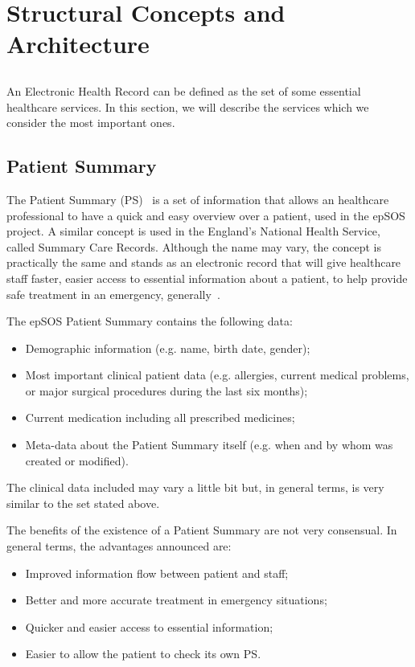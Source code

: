 \chapter{Structural Concepts and Architecture}

\section*{}
An Electronic Health Record can be defined as the set of some essential healthcare services. In this section, we will describe the services which we consider the most important ones.

\section{Patient Summary} \label{sec:pat_sum}

The Patient Summary (PS)~\citep{EPSOS_PS} is a set of information that allows an healthcare professional to have a quick and easy overview over a patient, used in the epSOS project. A similar concept is used in the England's National Health Service, called Summary Care Records. Although the name may vary, the concept is practically the same and stands as an electronic record that will give healthcare staff faster, easier access to essential information about a patient, to help provide safe treatment in an emergency, generally~\citep{Service2010}.

The epSOS Patient Summary contains the following data:
\begin{itemize}
\item Demographic information (e.g. name, birth date, gender);
\item Most important clinical patient data (e.g. allergies, current medical problems, or major surgical procedures during the last six months);
\item Current medication including all prescribed medicines;
\item Meta-data about the Patient Summary itself (e.g. when and by whom was created or modified).
\end{itemize}

The clinical data included may vary a little bit but, in general terms, is very similar to the set stated above. 

The benefits of the existence of a Patient Summary are not very consensual. In general terms, the advantages announced are:
\begin{itemize}
\item Improved information flow between patient and staff;
\item Better and more accurate treatment in emergency situations;
\item Quicker and easier access to essential information;
\item Easier to allow the patient to check its own PS.
\end{itemize}

